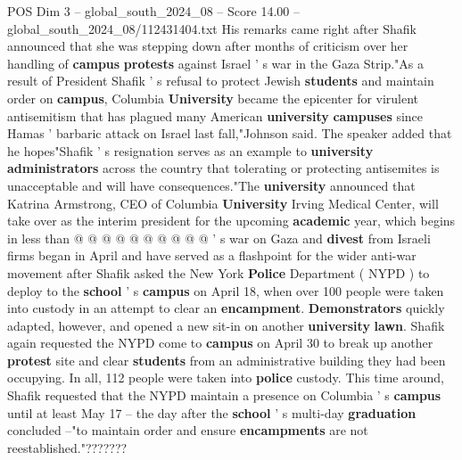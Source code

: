 \begin{textsample}{POS Dim 3 – global\_south\_2024\_08 – Score 14.00 – global\_south\_2024\_08/112431404.txt}
His remarks came right after Shafik announced that she was stepping down after months of criticism over her handling of \textbf{campus} \textbf{protests} against Israel ' s war in the Gaza Strip."As a result of President Shafik ' s refusal to protect Jewish \textbf{students} and maintain order on \textbf{campus}, Columbia \textbf{University} became the epicenter for virulent antisemitism that has plagued many American \textbf{university} \textbf{campuses} since Hamas ' barbaric attack on Israel last fall,"Johnson said.
The speaker added that he hopes"Shafik ' s resignation serves as an example to \textbf{university} \textbf{administrators} across the country that tolerating or protecting antisemites is unacceptable and will have consequences."The \textbf{university} announced that Katrina Armstrong, CEO of Columbia \textbf{University} Irving Medical Center, will take over as the interim president for the upcoming \textbf{academic} year, which begins in less than @ @ @ @ @ @ @ @ @ @ ' s war on Gaza and \textbf{divest} from Israeli firms began in April and have served as a flashpoint for the wider anti-war movement after Shafik asked the New York \textbf{Police} Department ( NYPD ) to deploy to the \textbf{school} ' s \textbf{campus} on April 18, when over 100 people were taken into custody in an attempt to clear an \textbf{encampment}. \textbf{Demonstrators} quickly adapted, however, and opened a new sit-in on another \textbf{university} \textbf{lawn}.
Shafik again requested the NYPD come to \textbf{campus} on April 30 to break up another \textbf{protest} site and clear \textbf{students} from an administrative building they had been occupying.
In all, 112 people were taken into \textbf{police} custody.
This time around, Shafik requested that the NYPD maintain a presence on Columbia ' s \textbf{campus} until at least May 17 -- the day after the \textbf{school} ' s multi-day \textbf{graduation} concluded --"to maintain order and ensure \textbf{encampments} are not reestablished."???????

\end{textsample}
